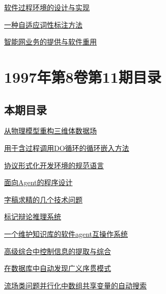 \documentclass[a4paper]{article}
\begin{document}
\href{http://www.jos.org.cn/ch/reader/download_pdf.aspx?file_no=19971208&year_id=1997&quarter_id=12&falg=1}{软件过程环境的设计与实现}

\href{http://www.jos.org.cn/ch/reader/download_pdf.aspx?file_no=19971209&year_id=1997&quarter_id=12&falg=1}{一种自适应词性标注方法}

\href{http://www.jos.org.cn/ch/reader/download_pdf.aspx?file_no=19971210&year_id=1997&quarter_id=12&falg=1}{智能网业务的提供与软件重用}


\section{\textbf{1997年第8卷第11期目录}}
\subsection{本期目录}
\href{http://www.jos.org.cn/ch/reader/download_pdf.aspx?file_no=19971101&year_id=1997&quarter_id=11&falg=1}{从物理模型重构三维体数据场}

\href{http://www.jos.org.cn/ch/reader/download_pdf.aspx?file_no=19971102&year_id=1997&quarter_id=11&falg=1}{用于含过程调用DO循环的循环嵌入方法}

\href{http://www.jos.org.cn/ch/reader/download_pdf.aspx?file_no=19971103&year_id=1997&quarter_id=11&falg=1}{协议形式化开发环境的规范语言}

\href{http://www.jos.org.cn/ch/reader/download_pdf.aspx?file_no=19971104&year_id=1997&quarter_id=11&falg=1}{面向Agent的程序设计}

\href{http://www.jos.org.cn/ch/reader/download_pdf.aspx?file_no=19971105&year_id=1997&quarter_id=11&falg=1}{字稿求精的几个技术问题}

\href{http://www.jos.org.cn/ch/reader/download_pdf.aspx?file_no=19971106&year_id=1997&quarter_id=11&falg=1}{标记辩论推理系统}

\href{http://www.jos.org.cn/ch/reader/download_pdf.aspx?file_no=19971107&year_id=1997&quarter_id=11&falg=1}{一个维护知识库的软件agent互操作系统}

\href{http://www.jos.org.cn/ch/reader/download_pdf.aspx?file_no=19971108&year_id=1997&quarter_id=11&falg=1}{高级综合中控制信息的提取与综合}

\href{http://www.jos.org.cn/ch/reader/download_pdf.aspx?file_no=19971109&year_id=1997&quarter_id=11&falg=1}{在数据库中自动发现广义序贯模式}

\href{http://www.jos.org.cn/ch/reader/download_pdf.aspx?file_no=19971110&year_id=1997&quarter_id=11&falg=1}{流场类问题并行化中数组共享变量的自动搜索}
\end{document}
